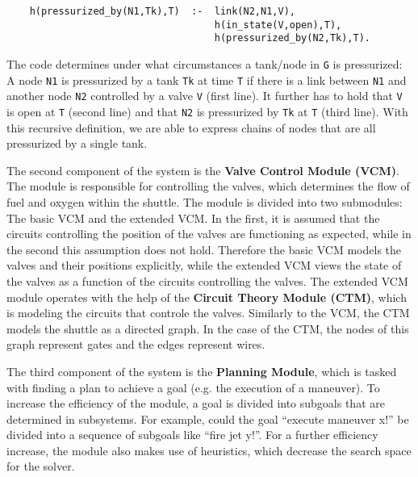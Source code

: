 \documentclass[runningheads]{llncs}
\begin{document}
\begin{verbatim}
    h(pressurized_by(N1,Tk),T)  :-  link(N2,N1,V),
                                    h(in_state(V,open),T),
                                    h(pressurized_by(N2,Tk),T).
\end{verbatim}
    
The code determines under what circumstances a tank/node in \verb|G| is pressurized: A node \verb|N1| is pressurized by a tank \verb|Tk| at time \verb|T| if there is a link between \verb|N1| and another node \verb|N2| controlled by a valve \verb|V| (first line). It further has to hold that \verb|V| is open at \verb|T| (second line) and that \verb|N2| is pressurized by \verb|Tk| at \verb|T| (third line). With this recursive definition, we are able to express chains of nodes that are all pressurized by a single tank. 

The second component of the system is the \textbf{Valve Control Module (VCM)}. The module is responsible for controlling the valves, which determines the flow of fuel and oxygen within the shuttle. The module is divided into two submodules: The basic VCM and the extended VCM. In the first, it is assumed that the circuits controlling the position of the valves are functioning as expected, while in the second this assumption does not hold. Therefore the basic VCM models the valves and their positions explicitly, while the extended VCM views the state of the valves as a function of the circuits controlling the valves. The extended VCM module operates with the help of the \textbf{Circuit Theory Module (CTM)}, which is modeling the circuits that controle the valves. Similarly to the VCM, the CTM models the shuttle as a directed graph. In the case of the CTM, the nodes of this graph represent gates and the edges represent wires. 

The third component of the system is the \textbf{Planning Module}, which is tasked with finding a plan to achieve a goal (e.g. the execution of a maneuver). To increase the efficiency of the module, a goal is divided into subgoals that are determined in subsystems. For example, could the goal ``execute maneuver x!'' be divided into a sequence of subgoals like ``fire jet y!''. For a further efficiency increase, the module also makes use of heuristics, which decrease the search space for the solver. 
\end{document}
